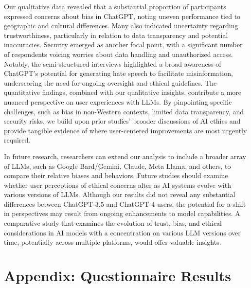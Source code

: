 \documentclass[sigconf]{acmart}
\begin{document}
Our qualitative data revealed that a substantial proportion of participants expressed concerns about bias in ChatGPT, noting uneven performance tied to geographic and cultural differences. Many also indicated uncertainty regarding trustworthiness, particularly in relation to data transparency and potential inaccuracies. Security emerged as another focal point, with a significant number of respondents voicing worries about data handling and unauthorized access. Notably, the semi-structured interviews highlighted a broad awareness of ChatGPT’s potential for generating hate speech to facilitate misinformation, underscoring the need for ongoing oversight and ethical guidelines. The quantitative findings, combined with our qualitative insights, contribute a more nuanced perspective on user experiences with LLMs. By pinpointing specific challenges, such as bias in non-Western contexts, limited data transparency, and security risks, we build upon prior studies’ broader discussions of AI ethics and provide tangible evidence of where user-centered improvements are most urgently required. 

In future research, researchers can extend our analysis to include a broader array of LLMs, such as Google Bard/Gemini, Claude, Meta Llama, and others, to compare their relative biases and behaviors. Future studies should examine whether user perceptions of ethical concerns alter as AI systems evolve with various versions of LLMs. Although our results did not reveal any substantial differences between ChatGPT-3.5 and ChatGPT-4 users, the potential for a shift in perspectives may result from ongoing enhancements to model capabilities. A comparative study that examines the evolution of trust, bias, and ethical considerations in AI models with a concentration on various LLM versions over time, potentially across multiple platforms, would offer valuable insights.










\onecolumn %

\appendix %
\section{Appendix: Questionnaire Results}
\end{document}
